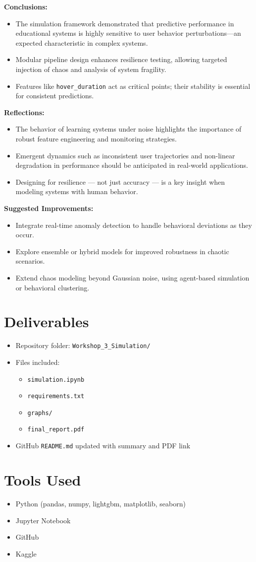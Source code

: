 \documentclass[12pt]{article}
\begin{document}
	\textbf{Conclusions:}
	\begin{itemize}
		\item The simulation framework demonstrated that predictive performance in educational systems is highly sensitive to user behavior perturbations—an expected characteristic in complex systems.
		\item Modular pipeline design enhances resilience testing, allowing targeted injection of chaos and analysis of system fragility.
		\item Features like \texttt{hover\_duration} act as critical points; their stability is essential for consistent predictions.
	\end{itemize}
	
	\textbf{Reflections:}
	\begin{itemize}
		\item The behavior of learning systems under noise highlights the importance of robust feature engineering and monitoring strategies.
		\item Emergent dynamics such as inconsistent user trajectories and non-linear degradation in performance should be anticipated in real-world applications.
		\item Designing for resilience — not just accuracy — is a key insight when modeling systems with human behavior.
	\end{itemize}
	
	\textbf{Suggested Improvements:}
	\begin{itemize}
		\item Integrate real-time anomaly detection to handle behavioral deviations as they occur.
		\item Explore ensemble or hybrid models for improved robustness in chaotic scenarios.
		\item Extend chaos modeling beyond Gaussian noise, using agent-based simulation or behavioral clustering.
	\end{itemize}
	
	\section{Deliverables}
	\begin{itemize}
		\item Repository folder: \texttt{Workshop\_3\_Simulation/}
		\item Files included:
		\begin{itemize}
			\item \texttt{simulation.ipynb}
			\item \texttt{requirements.txt}
			\item \texttt{graphs/}
			\item \texttt{final\_report.pdf}
		\end{itemize}
		\item GitHub \texttt{README.md} updated with summary and PDF link
	\end{itemize}
	
	\section*{Tools Used}
	\begin{itemize}
		\item Python (pandas, numpy, lightgbm, matplotlib, seaborn)
		\item Jupyter Notebook
		\item GitHub
		\item Kaggle
	\end{itemize}
	
\end{document}
